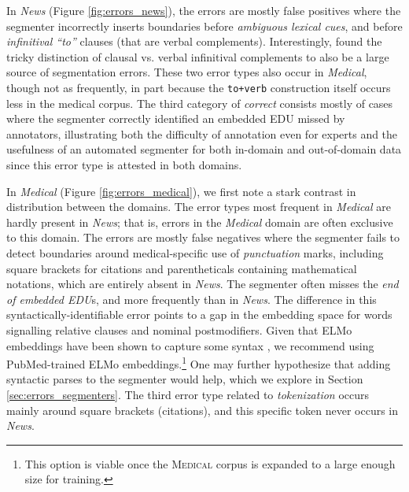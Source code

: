 In \textit{News} (Figure \ref{fig:errors_news}), the errors are mostly false positives where the segmenter incorrectly inserts boundaries before \textit{ambiguous lexical cues}, and before \textit{infinitival ``to''} clauses (that are verbal complements).  Interestingly,  found the tricky distinction of clausal vs. verbal infinitival complements to also be a large source of segmentation errors. These two error types also occur in \textit{Medical}, though not as frequently, in part because the \texttt{to+verb} construction itself occurs less in the medical corpus. The third category of \textit{correct} consists mostly of cases where the segmenter correctly identified an embedded EDU missed by annotators, illustrating both the difficulty of annotation even for experts and the usefulness of an automated segmenter for both in-domain and out-of-domain data since this error type is attested in both domains.

In \textit{Medical} (Figure \ref{fig:errors_medical}), we first note a stark contrast in distribution between the domains.  The error types most frequent in \textit{Medical} are hardly present in \textit{News}; that is, errors in the \textit{Medical} domain are often exclusive to this domain. The errors are mostly false negatives where the segmenter fails to detect boundaries around medical-specific use of \textit{punctuation} marks, including square brackets for citations and parentheticals containing mathematical notations, which are entirely absent in \textit{News}. The segmenter often misses the \textit{end of embedded EDU}s, and more frequently than in \textit{News}. The difference in this syntactically-identifiable error points to a gap in the embedding space for words signalling relative clauses and nominal postmodifiers. Given that ELMo embeddings have been shown to capture some syntax \cite{Tenney:2019}, we recommend using PubMed-trained ELMo embeddings.\footnote{This option is viable once the \textsc{Medical} corpus is expanded to a large enough size for training.} One may further hypothesize that adding syntactic parses to the segmenter would help, which we explore in Section \ref{sec:errors_segmenters}. The third error type related to \textit{tokenization} occurs mainly around square brackets (citations), and this specific token never occurs in \textit{News}. 

